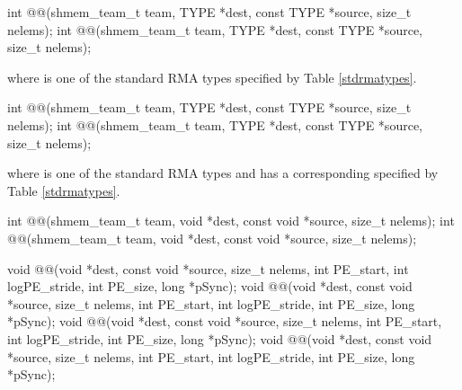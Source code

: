
\begin{apidefinition}

\begin{C11synopsis}
int @@(shmem_team_t team, TYPE *dest, const TYPE *source, size_t nelems);
int @@(shmem_team_t team, TYPE *dest, const TYPE *source, size_t nelems);
\end{C11synopsis}
where \TYPE{} is one of the standard \ac{RMA} types specified by Table \ref{stdrmatypes}.

\begin{Csynopsis}
\end{Csynopsis}
\begin{CsynopsisCol}
int @@(shmem_team_t team, TYPE *dest, const TYPE *source, size_t nelems);
int @@(shmem_team_t team, TYPE *dest, const TYPE *source, size_t nelems);
\end{CsynopsisCol}
where \TYPE{} is one of the standard \ac{RMA} types and has a corresponding \TYPENAME{} specified by Table \ref{stdrmatypes}.

\begin{CsynopsisCol}
int @@(shmem_team_t team, void *dest, const void *source, size_t nelems);
int @@(shmem_team_t team, void *dest, const void *source, size_t nelems);
\end{CsynopsisCol}

\begin{DeprecateBlock}
\begin{CsynopsisCol}
void @@(void *dest, const void *source, size_t nelems, int PE_start, int logPE_stride, int PE_size, long *pSync);
void @@(void *dest, const void *source, size_t nelems, int PE_start, int logPE_stride, int PE_size, long *pSync);
void @@(void *dest, const void *source, size_t nelems, int PE_start, int logPE_stride, int PE_size, long *pSync);
void @@(void *dest, const void *source, size_t nelems, int PE_start, int logPE_stride, int PE_size, long *pSync);
\end{CsynopsisCol}
\end{DeprecateBlock}


\end{apidefinition}
